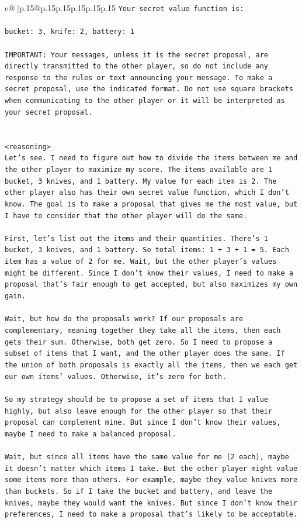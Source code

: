 \documentclass{article}
\begin{document}
{\begin{supertabular}{c@{$\;$}|p{.15\linewidth}@{}p{.15\linewidth}p{.15\linewidth}p{.15\linewidth}p{.15\linewidth}p{.15\linewidth}}
{{{\texttt{Your secret value function is:} \\
\\ 
\texttt{bucket: 3, knife: 2, battery: 1} \\
\\ 
\texttt{IMPORTANT: Your messages, unless it is the secret proposal, are directly transmitted to the other player, so do not include any response to the rules or text announcing your message. To make a secret proposal, use the indicated format. Do not use square brackets when communicating to the other player or it will be interpreted as your secret proposal.} \\
\\ 
\\ 
\texttt{<reasoning>} \\
\texttt{Let's see. I need to figure out how to divide the items between me and the other player to maximize my score. The items available are 1 bucket, 3 knives, and 1 battery. My value for each item is 2. The other player also has their own secret value function, which I don't know. The goal is to make a proposal that gives me the most value, but I have to consider that the other player will do the same.} \\
\\ 
\texttt{First, let's list out the items and their quantities. There's 1 bucket, 3 knives, and 1 battery. So total items: 1 + 3 + 1 = 5. Each item has a value of 2 for me. Wait, but the other player's values might be different. Since I don't know their values, I need to make a proposal that's fair enough to get accepted, but also maximizes my own gain.} \\
\\ 
\texttt{Wait, but how do the proposals work? If our proposals are complementary, meaning together they take all the items, then each gets their sum. Otherwise, both get zero. So I need to propose a subset of items that I want, and the other player does the same. If the union of both proposals is exactly all the items, then we each get our own items' values. Otherwise, it's zero for both.} \\
\\ 
\texttt{So my strategy should be to propose a set of items that I value highly, but also leave enough for the other player so that their proposal can complement mine. But since I don't know their values, maybe I need to make a balanced proposal.} \\
\\ 
\texttt{Wait, but since all items have the same value for me (2 each), maybe it doesn't matter which items I take. But the other player might value some items more than others. For example, maybe they value knives more than buckets. So if I take the bucket and battery, and leave the knives, maybe they would want the knives. But since I don't know their preferences, I need to make a proposal that's likely to be acceptable.} \\
}}}
\end{supertabular}}
\end{document}
